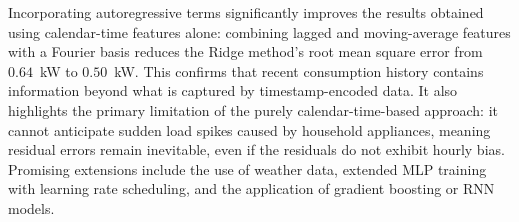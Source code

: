 \documentclass[11pt]{article}
\begin{document}
Incorporating autoregressive terms significantly improves the results obtained using calendar-time features alone: combining lagged and moving-average features with a Fourier basis reduces the Ridge method's root mean square error from $0.64$~kW to $0.50$~kW. This confirms that recent consumption history contains information beyond what is captured by timestamp-encoded data. It also highlights the primary limitation of the purely calendar-time-based approach: it cannot anticipate sudden load spikes caused by household appliances, meaning residual errors remain inevitable, even if the residuals do not exhibit hourly bias. Promising extensions include the use of weather data, extended MLP training with learning rate scheduling, and the application of gradient boosting or RNN models.
\end{document}
